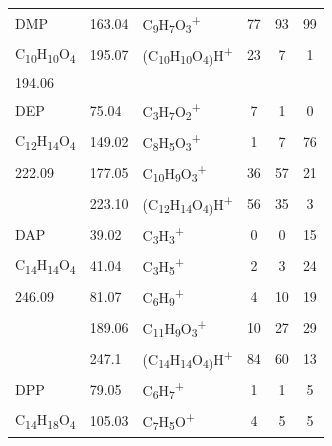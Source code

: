 {\begin{longtable}[c]{lllccc}
\hline
DMP       &    163.04    &  C\textsubscript{9}H\textsubscript{7}O\textsubscript{3}\textsuperscript{+}   & 77 & 93 & 99   \\
C\textsubscript{10}H\textsubscript{10}O\textsubscript{4}          &    195.07            & (C\textsubscript{10}H\textsubscript{10}O\textsubscript{4)}H\textsuperscript{+} & 23& 7& 1\\
194.06          & &  & & & \\
\hline
DEP       & 75.04                & C\textsubscript{3}H\textsubscript{7}O\textsubscript{2}\textsuperscript{+}      & 7            & 1            & 0            \\
C\textsubscript{12}H\textsubscript{14}O\textsubscript{4}          & 149.02               & C\textsubscript{8}H\textsubscript{5}O\textsubscript{3}\textsuperscript{+}      & 1            & 7            & 76           \\
222.09          & 177.05               & C\textsubscript{10}H\textsubscript{9}O\textsubscript{3}\textsuperscript{+}     & 36           & 57           & 21           \\
          & 223.10                & (C\textsubscript{12}H\textsubscript{14}O\textsubscript{4)}H\textsuperscript{+} & 56           & 35           & 3            \\
\hline
DAP                                                      & 39.02  & C\textsubscript{3}H\textsubscript{3}\textsuperscript{+}                        & 0  & 0  & 15 \\
C\textsubscript{14}H\textsubscript{14}O\textsubscript{4} & 41.04  & C\textsubscript{3}H\textsubscript{5}\textsuperscript{+}                        & 2  & 3  & 24 \\
246.09                                                   & 81.07  & C\textsubscript{6}H\textsubscript{9}\textsuperscript{+}                        & 4  & 10 & 19 \\
                                                         & 189.06 & C\textsubscript{11}H\textsubscript{9}O\textsubscript{3}\textsuperscript{+}     & 10 & 27 & 29 \\
                                                         & 247.1  & (C\textsubscript{14}H\textsubscript{14}O\textsubscript{4)}H\textsuperscript{+} & 84 & 60 & 13\\
\hline
DPP       & 79.05                & C\textsubscript{6}H\textsubscript{7}\textsuperscript{+}                           & 1            & 1            & 5            \\
C\textsubscript{14}H\textsubscript{18}O\textsubscript{4}          & 105.03               & C\textsubscript{7}H\textsubscript{5}O\textsuperscript{+}                          & 4            & 5            & 5            \\

\end{longtable}}
